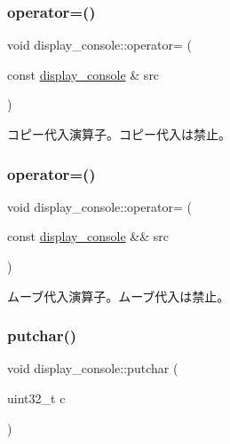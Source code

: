 \subsubsection{\texorpdfstring{operator=()}{operator=()}\hspace{0.1cm}{\footnotesize\ttfamily [1/2]}}
{\footnotesize\ttfamily void display\+\_\+console\+::operator= (\begin{DoxyParamCaption}\item[{const \hyperlink{classdisplay__console}{display\+\_\+console} \&}]{src }\end{DoxyParamCaption})\hspace{0.3cm}{\ttfamily [delete]}}

コピー代入演算子。コピー代入は禁止。 \hypertarget{classdisplay__console_ae51c3d467acb46d3a9b715e5d362cc23}{}\label{classdisplay__console_ae51c3d467acb46d3a9b715e5d362cc23} 
\subsubsection{\texorpdfstring{operator=()}{operator=()}\hspace{0.1cm}{\footnotesize\ttfamily [2/2]}}
{\footnotesize\ttfamily void display\+\_\+console\+::operator= (\begin{DoxyParamCaption}\item[{const \hyperlink{classdisplay__console}{display\+\_\+console} \&\&}]{src }\end{DoxyParamCaption})\hspace{0.3cm}{\ttfamily [delete]}}

ムーブ代入演算子。ムーブ代入は禁止。 \hypertarget{classdisplay__console_a06e4aae84b14832a690bb915a33f54f0}{}\label{classdisplay__console_a06e4aae84b14832a690bb915a33f54f0} 
\subsubsection{\texorpdfstring{putchar()}{putchar()}}
{\footnotesize\ttfamily void display\+\_\+console\+::putchar (\begin{DoxyParamCaption}\item[{uint32\+\_\+t}]{c }\end{DoxyParamCaption})\hspace{0.3cm}{\ttfamily [virtual]}}

